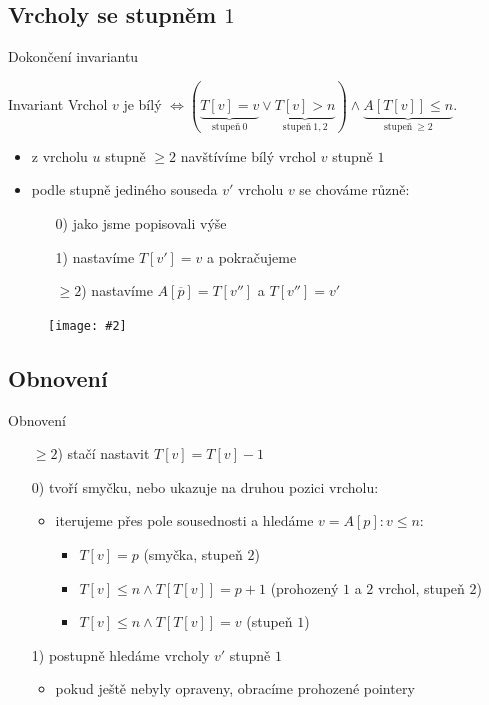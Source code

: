 \documentclass[czech]{beamer}
\makeatletter
\newcommand{\fitimage}[2][\@nil]{
	\begin{figure}
		\begin{adjustbox}{width=0.9\textwidth, totalheight=\textheight-2\baselineskip-2\baselineskip,keepaspectratio}
			\texttt{[image: \#2]}
		\end{adjustbox}
		\def\tmp{#1}%
	 \ifx\tmp\@nnil
			\else
			\caption{#1}
		\fi
	\end{figure}
}
\makeatother
\begin{document}
	\subsection{Vrcholy se stupněm $1$}
	\begin{frame}{Dokončení invariantu}
		\begin{block}{Invariant}
			Vrchol $v$ je bílý $\iff (\underbrace{T\left[v\right] = v}_{\text{stupeň}\ 0} \lor \underbrace{T[v] > n}_{\text{stupeň}\ 1, 2}) \land \underbrace{A[T[v]] \le n}_{\text{stupeň}\ \ge2}$.
		\end{block}
		\vfill
		\begin{itemize}
			\item z vrcholu $u$ stupně $\ge 2$ navštívíme bílý vrchol $v$ stupně $1$
			\item podle stupně jediného souseda $v'$ vrcholu $v$ se chováme různě:
			\begin{enumerate}
				\item[0)] jako jsme popisovali výše
				\item[1)] nastavíme $T[v'] = v$ a pokračujeme
				\item[$\ge 2$)] nastavíme $A[\overline{p}] = T[v'']$ a $T[v''] = v'$
			\end{enumerate}
		\end{itemize}
		\fitimage{images/deg1.png}
	\end{frame}

	\subsection{Obnovení}
	\begin{frame}{Obnovení}
		\hfill
		\begin{minipage}[t]{0.97\textwidth}
			\begin{enumerate}
				\item[$\ge 2$)] stačí nastavit $T[v] = T[v] - 1$
				\item[0)] tvoří smyčku, nebo ukazuje na druhou pozici vrcholu:
				\begin{itemize}
					\item iterujeme přes pole sousednosti a hledáme $v = A[p]: v \le n$:
					\begin{itemize}
						\item $T[v] = p$ (smyčka, stupeň $2$)
						\item $T[v] \le n \land T[T[v]] = p + 1$ (prohozený $1$ a $2$ vrchol, stupeň $2$)
						\item $T[v] \le n \land T[T[v]] = v$ (stupeň $1$)
					\end{itemize}
				\end{itemize}
				\item[1)] postupně hledáme vrcholy $v'$ stupně $1$
				\begin{itemize}
					\item pokud ještě nebyly opraveny, obracíme prohozené pointery
				\end{itemize}
			\end{enumerate}
		\end{minipage}
	\end{frame}
\end{document}
